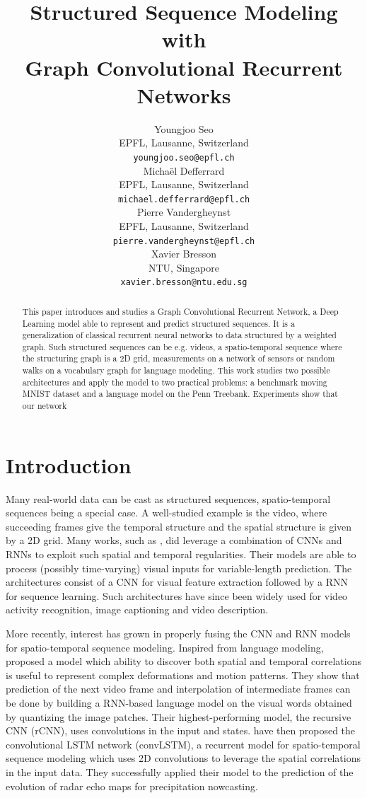 \documentclass{article} %
\title{Structured Sequence Modeling with \\
Graph Convolutional Recurrent Networks}
\author{Youngjoo Seo \\
EPFL, Lausanne, Switzerland \\
\texttt{youngjoo.seo@epfl.ch} \\
\And
Michaël Defferrard \\
EPFL, Lausanne, Switzerland \\
\texttt{michael.defferrard@epfl.ch} \\
\And
Pierre Vandergheynst \\
EPFL, Lausanne, Switzerland \\
\texttt{pierre.vandergheynst@epfl.ch} \\
\And
Xavier Bresson \\
NTU, Singapore \\
\texttt{xavier.bresson@ntu.edu.sg} \\
}
\newcommand{\todo}[1]{{\color{red} #1 }}
\begin{document}
\maketitle

\begin{abstract}
	This paper introduces and studies a Graph Convolutional Recurrent
	Network, a Deep Learning model able to represent and predict structured
	sequences. It is a generalization of classical recurrent neural networks to
	data structured by a weighted graph.
	Such structured sequences can be e.g. videos, a spatio-temporal sequence
	where the structuring graph is a 2D grid, measurements on a network of
	sensors or random walks on a vocabulary graph for language modeling.
	This work studies two possible architectures and apply the model to two
	practical problems: a benchmark moving MNIST dataset and a language model
	on the Penn Treebank. Experiments \todo{show that our network}
\end{abstract}

\section{Introduction}


Many real-world data can be cast as structured sequences, spatio-temporal
sequences being a special case. A well-studied example is the video, where
succeeding frames give the temporal structure and the spatial structure is
given by a 2D grid. Many works, such as \citet{cnnlstm1, cnnlstm2, cnnlstm3},
did leverage a combination of CNNs and RNNs to exploit such spatial and
temporal regularities. Their models are able to process (possibly time-varying)
visual inputs for variable-length prediction. The architectures consist of a
CNN for visual feature extraction followed by a RNN for sequence learning. Such
architectures have since been widely used for video activity recognition, image
captioning and video description.

More recently, interest has grown in properly fusing the CNN and RNN models for
spatio-temporal sequence modeling. Inspired from language modeling,
\citet{video_language_model} proposed a model which ability to discover both
spatial and temporal correlations is useful to represent complex deformations
and motion patterns. They show that prediction of the next video frame and
interpolation of intermediate frames can be done by building a RNN-based
language model on the visual words obtained by quantizing the image patches.
Their highest-performing model, the recursive CNN (rCNN), uses convolutions in
the input and states. \citet{convlstm} have then proposed the convolutional
LSTM network (convLSTM), a recurrent model for spatio-temporal sequence
modeling which uses 2D convolutions to leverage the spatial correlations in the
input data. They successfully applied their model to the prediction of the
evolution of radar echo maps for precipitation nowcasting.
\end{document}
